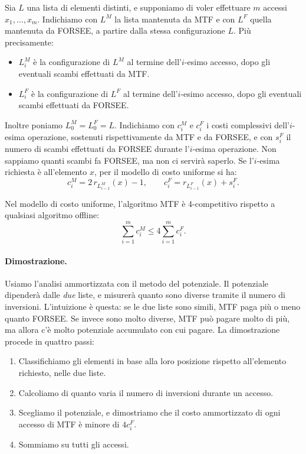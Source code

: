 Sia $L$ una lista di elementi distinti, e supponiamo di voler effettuare $m$ accessi $x_1, \dots, x_m$. Indichiamo con $L^M$ la lista mantenuta da MTF e con $L^F$ quella mantenuta da FORSEE, a partire dalla stessa configurazione $L$. Più precisamente:
\begin{itemize}
    \item $L^M_i$ è la configurazione di $L^M$ al termine dell'$i$-esimo accesso, dopo gli eventuali scambi effettuati da MTF.
    \item $L^F_i$ è la configurazione di $L^F$ al termine dell'$i$-esimo accesso, dopo gli eventuali scambi effettuati da FORSEE.
\end{itemize}
Inoltre poniamo $L^M_0 = L^F_0 = L$. Indichiamo con $c^M_i$ e $c^F_i$ i costi complessivi dell'$i$-esima operazione, sostenuti rispettivamente da MTF e da FORSEE, e con $s^F_i$ il numero di scambi effettuati da FORSEE durante l'$i$-esima operazione. Non sappiamo quanti scambi fa FORSEE, ma non ci servirà saperlo. Se l'$i$-esima richiesta è all'elemento $x$, per il modello di costo uniforme si ha:
\begin{equation}\label{eq:mtf-costi}
c^M_i = 2\, r_{L^M_{i-1}}(x) - 1, \qquad c^F_i = r_{L^F_{i-1}}(x) + s^F_i.
\end{equation}

\begin{teorema}\label{thm:mtf}
Nel modello di costo uniforme, l'algoritmo MTF è 4-competitivo rispetto a qualsiasi algoritmo offline:
\[
\sum_{i=1}^{m} c^M_i \le 4 \sum_{i=1}^{m} c^F_i.
\]
\end{teorema}

\paragraph{Dimostrazione.}
Usiamo l'analisi ammortizzata con il metodo del potenziale. Il potenziale dipenderà dalle \emph{due} liste, e misurerà quanto sono diverse tramite il numero di inversioni. L'intuizione è questa: se le due liste sono simili, MTF paga più o meno quanto FORSEE. Se invece sono molto diverse, MTF può pagare molto di più, ma allora c'è molto potenziale accumulato con cui pagare. La dimostrazione procede in quattro passi:
\begin{enumerate}
    \item Classifichiamo gli elementi in base alla loro posizione rispetto all'elemento richiesto, nelle due liste.
    \item Calcoliamo di quanto varia il numero di inversioni durante un accesso.
    \item Scegliamo il potenziale, e dimostriamo che il costo ammortizzato di ogni accesso di MTF è minore di $4c^F_i$.
    \item Sommiamo su tutti gli accessi.
\end{enumerate}

